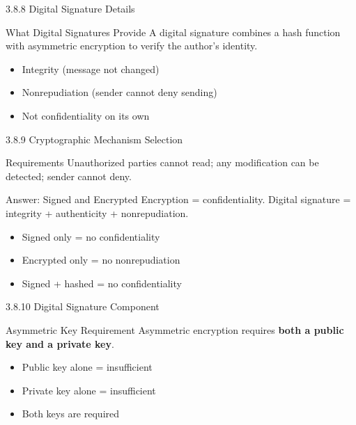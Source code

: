 \documentclass{beamer}
\begin{document}
	\begin{frame}{3.8.8 Digital Signature Details}
		\begin{block}{What Digital Signatures Provide}
			A digital signature combines a hash function with asymmetric encryption to verify the author's identity.
		\end{block}
		\begin{itemize}
			\item Integrity (message not changed)
			\item Nonrepudiation (sender cannot deny sending)
			\item Not confidentiality on its own
		\end{itemize}
	\end{frame}
	
	\begin{frame}{3.8.9 Cryptographic Mechanism Selection}
		\begin{block}{Requirements}
			Unauthorized parties cannot read; any modification can be detected; sender cannot deny.
		\end{block}
		\begin{exampleblock}{Answer: Signed and Encrypted}
			Encryption = confidentiality. Digital signature = integrity + authenticity + nonrepudiation.
		\end{exampleblock}
		\begin{itemize}
			\item Signed only = no confidentiality
			\item Encrypted only = no nonrepudiation
			\item Signed + hashed = no confidentiality
		\end{itemize}
	\end{frame}
	
	\begin{frame}{3.8.10 Digital Signature Component}
		\begin{block}{Asymmetric Key Requirement}
			Asymmetric encryption requires \textbf{both a public key and a private key}.
		\end{block}
		\begin{itemize}
			\item Public key alone = insufficient
			\item Private key alone = insufficient
			\item Both keys are required
		\end{itemize}
	\end{frame}
	
	
\end{document}

